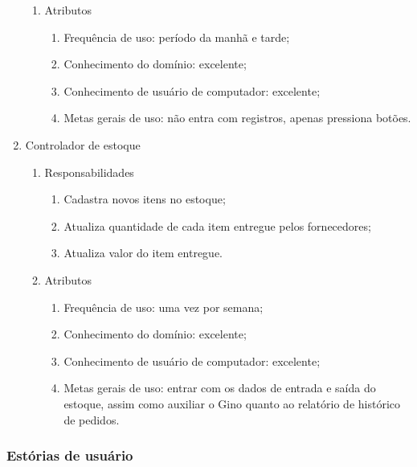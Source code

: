 \begin{enumerate}
\begin{enumerate}
    \item Atributos

      \begin{enumerate}
          \item Frequência de uso: período da manhã e tarde;
          \item Conhecimento do domínio: excelente;
          \item Conhecimento de usuário de computador: excelente;
          \item Metas gerais de uso: não entra com registros, apenas pressiona botões.
      \end{enumerate}
  \end{enumerate}

  \item Controlador de estoque

  \begin{enumerate}
    \item Responsabilidades

      \begin{enumerate}
          \item Cadastra novos itens no estoque;
          \item Atualiza quantidade de cada item entregue pelos fornecedores;
          \item Atualiza valor do item entregue.
      \end{enumerate}

    \item Atributos

      \begin{enumerate}
          \item Frequência de uso: uma vez por semana;
          \item Conhecimento do domínio: excelente;
          \item Conhecimento de usuário de computador: excelente;
          \item Metas gerais de uso: entrar com os dados de entrada e saída do estoque, assim como auxiliar o Gino quanto ao relatório de histórico de pedidos.

      \end{enumerate}
  \end{enumerate}

\end{enumerate}

\subsubsection{Estórias de usuário}


